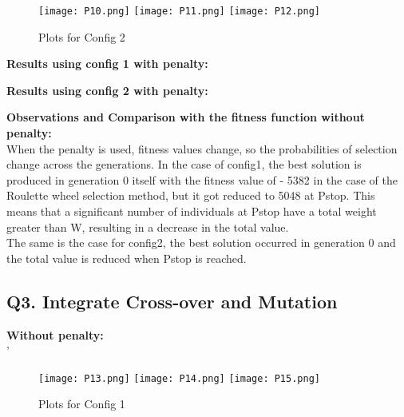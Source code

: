 \documentclass{article}
\begin{document}
{{\begin{figure}[h]
\centering
{
\texttt{[image: P10.png]}
}
{
\texttt{[image: P11.png]}
}
{
\texttt{[image: P12.png]}
}
\caption{Plots for Config 2}
\label{}
\end{figure}
{\textbf{Results using config 1 with penalty:} \\
\begin{table}[H]
\centering
{}
\caption{Best Individual across all generations} 
\end{table} 

{\textbf{Results using config 2 with penalty:} \\
\begin{table}[H]
\centering
{}
\caption{Best Individual across all generations} 
\end{table}
\textbf{Observations and Comparison with the fitness function without penalty:} \\
When the penalty is used, fitness values change, so the probabilities of selection change across the generations. In the case of config1, the best solution is produced in generation 0 itself with the fitness value of - 5382 in the case of the Roulette wheel selection method, but it got reduced to 5048 at Pstop. This means that a significant number of individuals at Pstop have a total weight greater than W, resulting in a decrease in the total value.\\
The same is the case for config2, the best solution occurred in generation 0 and the total value is reduced when Pstop is reached. \\

\subsection*{\textbf{Q3. Integrate Cross-over and Mutation}}
\textbf{Without penalty: } \\'
\begin{figure}[h]
\centering
{
\texttt{[image: P13.png]}
}
{
\texttt{[image: P14.png]}
}
{
\texttt{[image: P15.png]}
}
\caption{Plots for Config 1}
\label{}
\end{figure}

}}}}
\end{document}
